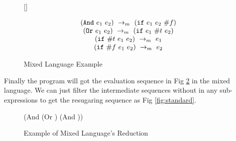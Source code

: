 \begin{figure}[thb]
[\linewidth]{
\begin{flushleft}
\[
\begin{array}{c}
(\mbox{\tt And}~e_1~e_2) ~\rightarrow_m~(\mbox{\tt if}~e_1~e_2~\#f)\\
(\mbox{\tt Or}~e_1~e_2) ~\rightarrow_m~(\mbox{\tt if}~e_1~\#t~e_2)\\
(\mbox{\tt if}~\#t~e_1~e_2) ~\rightarrow_m~e_1\\
(\mbox{\tt if}~\#f~e_1~e_2) ~\rightarrow_m~e_2 
\end{array}
\]
\end{flushleft}

}

\caption{Mixed Language Example}
\label{fig:mixexample}
\end{figure}

Finally the program  will got the evaluation sequence in Fig \ref{fig:mixexec} in the mixed language. We can just filter the intermediate sequences without  in any sub-expressions to get the resugaring sequence as Fig \ref{fig:standard}.

\begin{figure}[thb]
\begin{center}
\begin{minipage}{6cm}
\begin{scriptsize}
\begin{Codes}
    (And (Or \true \false) (And \false \true))
\OneStep{ \false}
\end{Codes}
\end{scriptsize}
\end{minipage}
\end{center}
\caption{Example of Mixed Language's Reduction}
\label{fig:mixexec}
\end{figure}